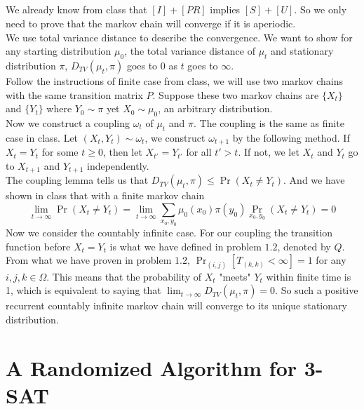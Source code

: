 \documentclass[12pt,letterpaper]{article}
\begin{document}
\subsection{}
We already know from class that $[I]+[PR]$ implies $[S]+[U]$.
So we only need to prove that the markov chain will converge if it is aperiodic.\\
We use total variance distance to describe the convergence. 
We want to show for any starting distribution $\mu_0$, 
the total variance distance of $\mu_t$ and stationary distribution $\pi$, $D_{TV}(\mu_t,\pi)$
goes to $0$ as $t$ goes to $\infty$.\\
Follow the instructions of finite case from class, 
we will use two markov chains with the same transition matrix $P$.
Suppose these two markov chains are $\{X_t\}$ and $\{Y_t\}$ where $Y_0\sim\pi$ yet $X_0\sim\mu_0$, an arbitrary distribution.\\
Now we construct a coupling $\omega_t$ of $\mu_t$ and $\pi$.
The coupling is the same as finite case in class.
Let $(X_t,Y_t)\sim\omega_t$, we construct $\omega_{t+1}$ by the following method.
If $X_t=Y_t$ for some $t\geq 0$, then let $X_{t'}=Y_{t'}$ for all $t'>t$. 
If not, we let $X_t$ and $Y_t$ go to $X_{t+1}$ and $Y_{t+1}$ independently.\\
The coupling lemma tells us that $D_{TV}(\mu_t,\pi)\leq\Pr(X_t\neq Y_t)$. 
And we have shown in class that with a finite markov chain 
$$\lim_{t\to\infty}\Pr(X_t\neq Y_t)=\lim_{t\to\infty}\sum_{x_{0},y_{0}}\mu_{0}(x_0)\pi(y_0)\Pr_{x_0,y_0}(X_t\neq Y_t)=0$$
Now we consider the countably infinite case. For our coupling the transition function before $X_t=Y_t$ is what we have defined in problem $1.2$, denoted by $Q$.
From what we have proven in problem $1.2$, $\Pr_{(i,j)}[T_{(k,k)}<\infty]=1$ for any $i,j,k\in\Omega$.
This means that the probability of $X_t$ "meets" $Y_t$ within finite time is 1,
which is equivalent to saying that $\lim_{t\to\infty}D_{TV}(\mu_t,\pi)=0$.
So such a positive recurrent countably infinite markov chain will converge to its unique stationary distribution.


\newpage
\section{A Randomized Algorithm for 3-SAT}
\end{document}
